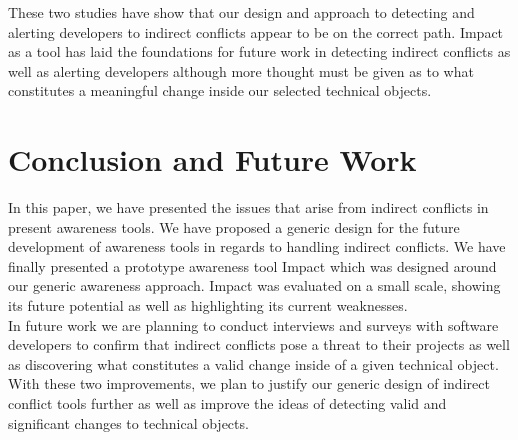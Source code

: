 \documentclass[conference]{IEEEtran}
\begin{document}
These two studies have show that our design and approach to
detecting and alerting developers to indirect conflicts appear
to be on the correct path. Impact as a tool has laid the foundations
for future work in detecting indirect conflicts as well as alerting
developers although more thought must be given as to 
what constitutes a meaningful change inside our selected 
technical objects.\\


\section{Conclusion and Future Work}
In this paper, we have presented the issues that arise from indirect 
conflicts in present awareness tools. We have proposed a generic 
design for the future development of awareness tools in regards to
handling indirect conflicts. We have finally presented a prototype 
awareness tool Impact which was designed around our generic 
awareness approach. Impact was evaluated on a small scale, showing
its future potential as well as highlighting its current weaknesses.\\

In future work we are planning to conduct interviews and surveys
with software developers to confirm that indirect conflicts pose a
threat to their projects as well as discovering what constitutes a 
valid change inside of a given technical object. With these two
improvements, we plan to justify our generic design of indirect
conflict tools further as well as improve the ideas of detecting 
valid and significant changes to technical objects.\\




\end{document}
